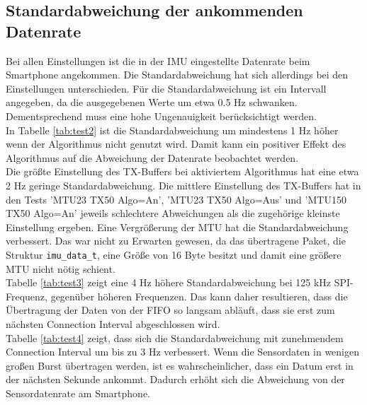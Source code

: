 \subsection{Standardabweichung der ankommenden Datenrate}
Bei allen Einstellungen ist die in der IMU eingestellte Datenrate beim Smartphone angekommen.
Die Standardabweichung hat sich allerdings bei den Einstellungen unterschieden.
Für die Standardabweichung ist ein Intervall angegeben, da die ausgegebenen Werte um etwa 0.5 Hz schwanken.
Dementsprechend muss eine hohe Ungenauigkeit berücksichtigt werden.\\
In Tabelle \ref{tab:test2} ist die Standardabweichung um mindestens 1 Hz höher wenn der Algorithmus nicht genutzt wird.
Damit kann ein positiver Effekt des Algorithmus auf die Abweichung der Datenrate beobachtet werden.\\
Die größte Einstellung des TX-Buffers bei aktiviertem Algorithmus hat eine etwa 2 Hz geringe Standardabweichung.
Die mittlere Einstellung des TX-Buffers hat in den Tests 'MTU23 TX50 Algo=An', 'MTU23 TX50 Algo=Aus' und 'MTU150 TX50 Algo=An' jeweils schlechtere Abweichungen als die zugehörige kleinste Einstellung ergeben.
Eine Vergrößerung der MTU hat die Standardabweichung verbessert.
Das war nicht zu Erwarten gewesen, da das übertragene Paket, die Struktur \texttt{imu\_data\_t}, eine Größe von 16 Byte besitzt und damit eine größere MTU nicht nötig schient.\\
Tabelle \ref{tab:test3} zeigt eine 4 Hz höhere Standardabweichung bei 125 kHz SPI-Frequenz, gegenüber höheren Frequenzen.
Das kann daher resultieren, dass die Übertragung der Daten von der FIFO so langsam abläuft, dass sie erst zum nächsten Connection Interval abgeschlossen wird.\\
Tabelle \ref{tab:test4} zeigt, dass sich die Standardabweichung mit zunehmendem Connection Interval um bis zu 3 Hz verbessert.
Wenn die Sensordaten in wenigen großen Burst übertragen werden, ist es wahrscheinlicher, dass ein Datum erst in der nächsten Sekunde ankommt.
Dadurch erhöht sich die Abweichung von der Sensordatenrate am Smartphone.
